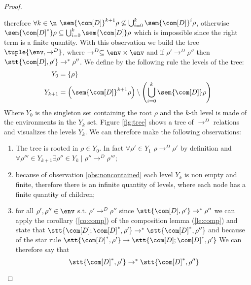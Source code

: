 \begin{proof}
\begin{itemize}
    therefore \(\forall k \in \n\)
    \(\sem{\com[D]}^{k+1}\rho \not\subseteq \bigcup_{i=0}^k
    \sem{\com[D]}^i\rho\), otherwise
    \(\sem{\com[D]^*}\rho \subseteq \bigcup_{i=0}^k\sem{\com[D]}\rho\) which
    is impossible since the right term is a finite quantity.
    With this observation we build the tree \(\tuple{\env, \to^D}\),
    where \(\to^D \subseteq \env \times \env\) and if
    \(\rho' \to^D \rho''\) then \(\stt{\com[D], \rho'} \to^*
    \rho''\). We define by the following rule the levels of the tree:
    \begin{align*}
      Y_0 & = \{\rho\} \\
      Y_{k+1} & = \left(\sem{\com[D]}^{k+1}\rho\right) \setminus \left( \bigcup_{i=0}^k \sem{\com[D]}\rho \right)
    \end{align*}
    Where \(Y_0\) is the singleton set containing the root \(\rho\)
    and the \(k\)-th level is made of the environments in the \(Y_k\)
    set. Figure \ref{fig:tree} shows a tree of \(\to^D\) relations and
    visualizes the levels \(Y_k\). We can therefore make the following
    observations:
    \begin{enumerate}[label=(\roman*)]
    \item The tree is rooted in \(\rho \in Y_0\). In fact
      \(\forall \rho' \in Y_1\) \(\rho \to^D \rho'\) by definition and
      \(\forall \rho'''\in Y_{k+1} \exists \rho'' \in Y_k \mid \rho''
      \to^D \rho'''\);
    \item because of observation \ref{obs:noncontained} each level
      \(Y_k\) is non empty and finite, therefore there is an infinite
      quantity of levels, where each node has a finite quantity of
      children;
    \item\label{it:three} for all \(\rho', \rho''\in\env\)
      s.t. \(\rho' \to^D \rho''\) since
      \(\stt{\com[D], \rho'} \to^* \rho''\) we can apply the corollary
      (\ref{co:comp}) of the composition lemma (\ref{le:comp}) and
      state that
      \(\stt{\com[D];\com[D]^*, \rho'} \to^* \stt{\com[D]^*, \rho''}\)
      and because of the star rule
      \(\stt{\com[D]^*, \rho'} \to \stt{\com[D];\com[D]^*, \rho'}\) We
      can therefore say that
      \begin{equation*}
        \stt{\com[D]^*, \rho'} \to^* \stt{\com[D]^*, \rho''}
      \end{equation*}
    \end{enumerate}


\end{itemize}
\end{proof}
